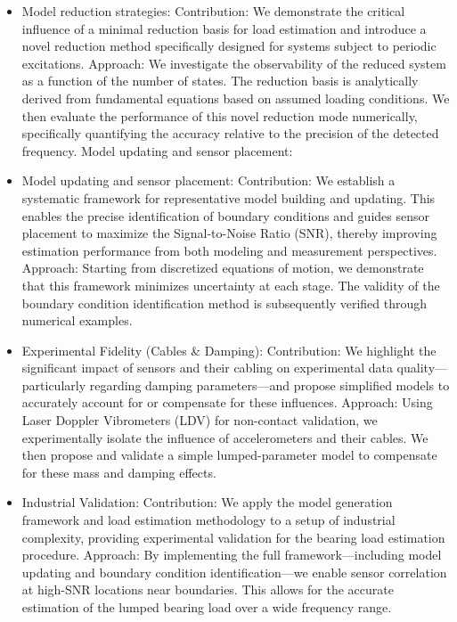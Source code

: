 \begin{itemize}
  \item Model reduction strategies:
Contribution: We demonstrate the critical influence of a minimal reduction basis for load estimation and introduce a novel reduction method specifically designed for systems subject to periodic excitations.
Approach: We investigate the observability of the reduced system as a function of the number of states. The reduction basis is analytically derived from fundamental equations based on assumed loading conditions. We then evaluate the performance of this novel reduction mode numerically, specifically quantifying the accuracy relative to the precision of the detected frequency.
Model updating and sensor placement:
 \item Model updating and sensor placement:
Contribution: We establish a systematic framework for representative model building and updating. This enables the precise identification of boundary conditions and guides sensor placement to maximize the Signal-to-Noise Ratio (SNR), thereby improving estimation performance from both modeling and measurement perspectives.
Approach: Starting from discretized equations of motion, we demonstrate that this framework minimizes uncertainty at each stage. The validity of the boundary condition identification method is subsequently verified through numerical examples.
  \item Experimental Fidelity (Cables \& Damping):
Contribution: We highlight the significant impact of sensors and their cabling on experimental data quality—particularly regarding damping parameters—and propose simplified models to accurately account for or compensate for these influences.
Approach: Using Laser Doppler Vibrometers (LDV) for non-contact validation, we experimentally isolate the influence of accelerometers and their cables. We then propose and validate a simple lumped-parameter model to compensate for these mass and damping effects.
  \item Industrial Validation:
Contribution: We apply the model generation framework and load estimation methodology to a setup of industrial complexity, providing experimental validation for the bearing load estimation procedure.
Approach: By implementing the full framework—including model updating and boundary condition identification—we enable sensor correlation at high-SNR locations near boundaries. This allows for the accurate estimation of the lumped bearing load over a wide frequency range.
\end{itemize}



